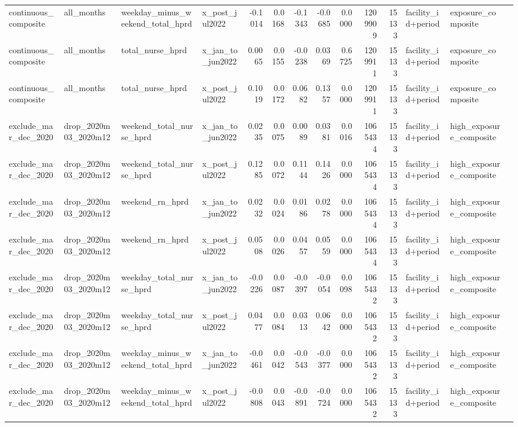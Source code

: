 \begin{tabular}{llllrrrrrrrlll}
continuous_composite & all_months & weekday_minus_weekend_total_hprd & x_post_jul2022 & -0.1014 & 0.0168 & -0.1343 & -0.0685 & 0.0000 & 1209909 & 15133 & facility_id+period & exposure_composite &  \\
continuous_composite & all_months & total_nurse_hprd & x_jan_to_jun2022 & 0.0065 & 0.0155 & -0.0238 & 0.0369 & 0.6725 & 1209911 & 15133 & facility_id+period & exposure_composite &  \\
continuous_composite & all_months & total_nurse_hprd & x_post_jul2022 & 0.1019 & 0.0172 & 0.0682 & 0.1357 & 0.0000 & 1209911 & 15133 & facility_id+period & exposure_composite &  \\
exclude_mar_dec_2020 & drop_2020m03_2020m12 & weekend_total_nurse_hprd & x_jan_to_jun2022 & 0.0235 & 0.0075 & 0.0089 & 0.0381 & 0.0016 & 1065434 & 15133 & facility_id+period & high_exposure_composite &  \\
exclude_mar_dec_2020 & drop_2020m03_2020m12 & weekend_total_nurse_hprd & x_post_jul2022 & 0.1285 & 0.0072 & 0.1144 & 0.1426 & 0.0000 & 1065434 & 15133 & facility_id+period & high_exposure_composite &  \\
exclude_mar_dec_2020 & drop_2020m03_2020m12 & weekend_rn_hprd & x_jan_to_jun2022 & 0.0232 & 0.0024 & 0.0186 & 0.0278 & 0.0000 & 1065434 & 15133 & facility_id+period & high_exposure_composite &  \\
exclude_mar_dec_2020 & drop_2020m03_2020m12 & weekend_rn_hprd & x_post_jul2022 & 0.0508 & 0.0026 & 0.0457 & 0.0559 & 0.0000 & 1065434 & 15133 & facility_id+period & high_exposure_composite &  \\
exclude_mar_dec_2020 & drop_2020m03_2020m12 & weekday_total_nurse_hprd & x_jan_to_jun2022 & -0.0226 & 0.0087 & -0.0397 & -0.0054 & 0.0098 & 1065432 & 15133 & facility_id+period & high_exposure_composite &  \\
exclude_mar_dec_2020 & drop_2020m03_2020m12 & weekday_total_nurse_hprd & x_post_jul2022 & 0.0477 & 0.0084 & 0.0313 & 0.0642 & 0.0000 & 1065432 & 15133 & facility_id+period & high_exposure_composite &  \\
exclude_mar_dec_2020 & drop_2020m03_2020m12 & weekday_minus_weekend_total_hprd & x_jan_to_jun2022 & -0.0461 & 0.0042 & -0.0543 & -0.0377 & 0.0000 & 1065432 & 15133 & facility_id+period & high_exposure_composite &  \\
exclude_mar_dec_2020 & drop_2020m03_2020m12 & weekday_minus_weekend_total_hprd & x_post_jul2022 & -0.0808 & 0.0043 & -0.0891 & -0.0724 & 0.0000 & 1065432 & 15133 & facility_id+period & high_exposure_composite &  \\

\end{tabular}

